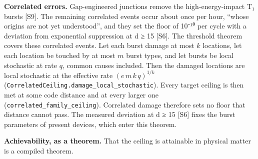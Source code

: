 \documentclass[
]{article}
\begin{document}
\textbf{Correlated errors.} Gap-engineered junctions remove the
high-energy-impact T₁ bursts {[}S9{]}. The remaining correlated events
occur about once per hour, ``whose origins are not yet understood'', and
they set the floor of 10⁻¹⁰ per cycle with a deviation from exponential
suppression at d ≥ 15 {[}S6{]}. The threshold theorem covers these
correlated events. Let each burst damage at most \(k\) locations, let
each location be touched by at most \(m\) burst types, and let bursts be
local stochastic at rate \(q\), common causes included. Then the damaged
locations are local stochastic at the effective rate
\((e\,m\,k\,q)^{1/k}\)
(\texttt{C\allowbreak{}o\allowbreak{}r\allowbreak{}r\allowbreak{}e\allowbreak{}l\allowbreak{}a\allowbreak{}t\allowbreak{}e\allowbreak{}d\allowbreak{}C\allowbreak{}e\allowbreak{}i\allowbreak{}l\allowbreak{}i\allowbreak{}n\allowbreak{}g\allowbreak{}.\allowbreak{}d\allowbreak{}a\allowbreak{}m\allowbreak{}a\allowbreak{}g\allowbreak{}e\allowbreak{}\_\allowbreak{}l\allowbreak{}o\allowbreak{}c\allowbreak{}a\allowbreak{}l\allowbreak{}\_\allowbreak{}s\allowbreak{}t\allowbreak{}o\allowbreak{}c\allowbreak{}h\allowbreak{}a\allowbreak{}s\allowbreak{}t\allowbreak{}i\allowbreak{}c}).
Every target ceiling is then met at some code distance and at every
larger one
(\texttt{c\allowbreak{}o\allowbreak{}r\allowbreak{}r\allowbreak{}e\allowbreak{}l\allowbreak{}a\allowbreak{}t\allowbreak{}e\allowbreak{}d\allowbreak{}\_\allowbreak{}f\allowbreak{}a\allowbreak{}m\allowbreak{}i\allowbreak{}l\allowbreak{}y\allowbreak{}\_\allowbreak{}c\allowbreak{}e\allowbreak{}i\allowbreak{}l\allowbreak{}i\allowbreak{}n\allowbreak{}g}).
Correlated damage therefore sets no floor that distance cannot pass. The
measured deviation at d ≥ 15 {[}S6{]} fixes the burst parameters of
present devices, which enter this theorem.

\textbf{Achievability, as a theorem.} That the ceiling is attainable in
physical matter is a compiled theorem.
\end{document}
